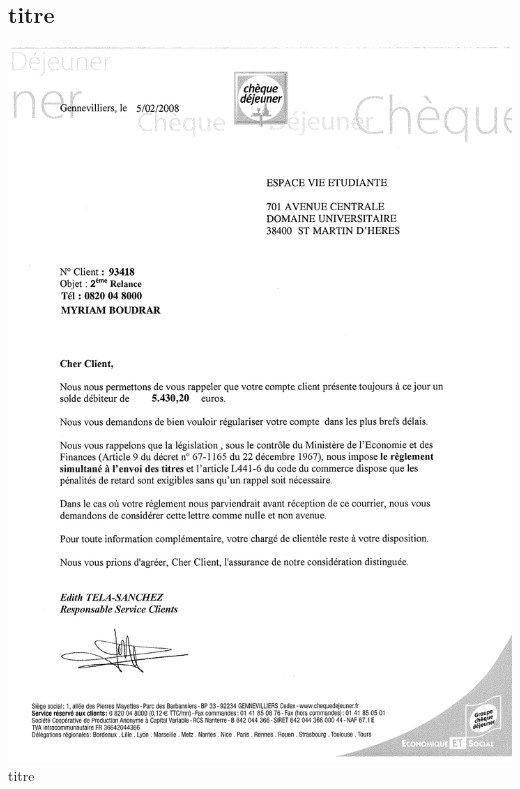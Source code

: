 \subsection{titre}
\begin{center}
\includegraphics[scale=0.6]{annexes/images/chequedejeuner_rappel.pdf} \\
titre
\end{center}
